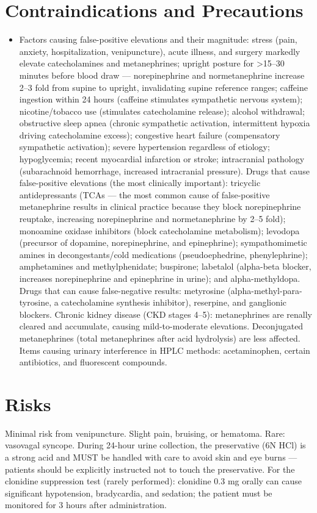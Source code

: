 \section*{Contraindications and Precautions}
\begin{itemize}
  \item Factors causing false-positive elevations and their magnitude: stress (pain, anxiety, hospitalization, venipuncture), acute illness, and surgery markedly elevate catecholamines and metanephrines; upright posture for >15--30 minutes before blood draw --- norepinephrine and normetanephrine increase 2--3 fold from supine to upright, invalidating supine reference ranges; caffeine ingestion within 24 hours (caffeine stimulates sympathetic nervous system); nicotine/tobacco use (stimulates catecholamine release); alcohol withdrawal; obstructive sleep apnea (chronic sympathetic activation, intermittent hypoxia driving catecholamine excess); congestive heart failure (compensatory sympathetic activation); severe hypertension regardless of etiology; hypoglycemia; recent myocardial infarction or stroke; intracranial pathology (subarachnoid hemorrhage, increased intracranial pressure). Drugs that cause false-positive elevations (the most clinically important): tricyclic antidepressants (TCAs --- the most common cause of false-positive metanephrine results in clinical practice because they block norepinephrine reuptake, increasing norepinephrine and normetanephrine by 2--5 fold); monoamine oxidase inhibitors (block catecholamine metabolism); levodopa (precursor of dopamine, norepinephrine, and epinephrine); sympathomimetic amines in decongestants/cold medications (pseudoephedrine, phenylephrine); amphetamines and methylphenidate; buspirone; labetalol (alpha-beta blocker, increases norepinephrine and epinephrine in urine); and alpha-methyldopa. Drugs that can cause false-negative results: metyrosine (alpha-methyl-para-tyrosine, a catecholamine synthesis inhibitor), reserpine, and ganglionic blockers. Chronic kidney disease (CKD stages 4--5): metanephrines are renally cleared and accumulate, causing mild-to-moderate elevations. Deconjugated metanephrines (total metanephrines after acid hydrolysis) are less affected. Items causing urinary interference in HPLC methods: acetaminophen, certain antibiotics, and fluorescent compounds.
\end{itemize}
\section*{Risks}
Minimal risk from venipuncture. Slight pain, bruising, or hematoma. Rare: vasovagal syncope. During 24-hour urine collection, the preservative (6N HCl) is a strong acid and MUST be handled with care to avoid skin and eye burns --- patients should be explicitly instructed not to touch the preservative. For the clonidine suppression test (rarely performed): clonidine 0.3 mg orally can cause significant hypotension, bradycardia, and sedation; the patient must be monitored for 3 hours after administration.

